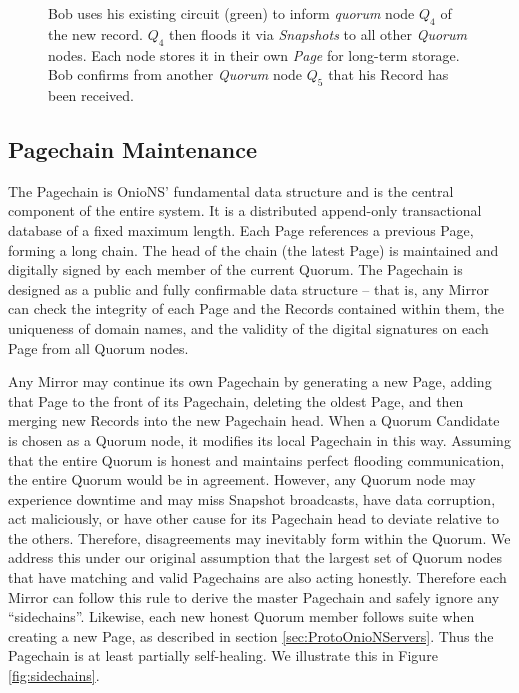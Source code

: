 \begin{figure}[htbp]
	\caption{Bob uses his existing circuit (green) to inform \emph{quorum} node $ Q_{4} $ of the new record. $ Q_{4} $ then floods it via \emph{Snapshots} to all other \emph{Quorum} nodes. Each node stores it in their own \emph{Page} for long-term storage. Bob confirms from another \emph{Quorum} node $ Q_{5} $ that his Record has been received.}
	\label{fig:recordBroadcast}
\end{figure}

\subsection{Pagechain Maintenance}

The Pagechain is OnioNS' fundamental data structure and is the central component of the entire system. It is a distributed append-only transactional database of a fixed maximum length. Each Page references a previous Page, forming a long chain. The head of the chain (the latest Page) is maintained and digitally signed by each member of the current Quorum. The Pagechain is designed as a public and fully confirmable data structure -- that is, any Mirror can check the integrity of each Page and the Records contained within them, the uniqueness of domain names, and the validity of the digital signatures on each Page from all Quorum nodes.

Any Mirror may continue its own Pagechain by generating a new Page, adding that Page to the front of its Pagechain, deleting the oldest Page, and then merging new Records into the new Pagechain head. When a Quorum Candidate is chosen as a Quorum node, it modifies its local Pagechain in this way. Assuming that the entire Quorum is honest and maintains perfect flooding communication, the entire Quorum would be in agreement. However, any Quorum node may experience downtime and may miss Snapshot broadcasts, have data corruption, act maliciously, or have other cause for its Pagechain head to deviate relative to the others. Therefore, disagreements may inevitably form within the Quorum. We address this under our original assumption that the largest set of Quorum nodes that have matching and valid Pagechains are also acting honestly. Therefore each Mirror can follow this rule to derive the master Pagechain and safely ignore any ``sidechains''. Likewise, each new honest Quorum member follows suite when creating a new Page, as described in section \ref{sec:ProtoOnioNServers}. Thus the Pagechain is at least partially self-healing. We illustrate this in Figure \ref{fig:sidechains}.

